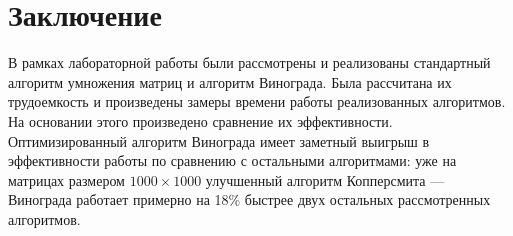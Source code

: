 \chapter*{Заключение}

В рамках лабораторной работы были рассмотрены и реализованы стандартный алгоритм умножения матриц и алгоритм Винограда.
Была рассчитана их трудоемкость и произведены замеры времени работы реализованных алгоритмов.
На основании этого произведено сравнение их эффективности.
Оптимизированный алгоритм Винограда имеет заметный выигрыш в эффективности работы по сравнению с остальными алгоритмами:
уже на матрицах размером $1000\times1000$ улучшенный алгоритм Копперсмита — Винограда работает примерно на 18\% быстрее двух остальных рассмотренных алгоритмов.
